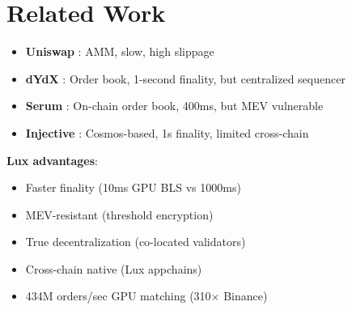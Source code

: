 \section{Related Work}


\begin{itemize}
    \item \textbf{Uniswap} \cite{adams2020}: AMM, slow, high slippage
    \item \textbf{dYdX} \cite{dydx2021}: Order book, 1-second finality, but centralized sequencer
    \item \textbf{Serum} \cite{serum2020}: On-chain order book, 400ms, but MEV vulnerable
    \item \textbf{Injective} \cite{injective2021}: Cosmos-based, 1s finality, limited cross-chain
\end{itemize}

\textbf{Lux advantages}:
\begin{itemize}
    \item Faster finality (10ms GPU BLS vs 1000ms)
    \item MEV-resistant (threshold encryption)
    \item True decentralization (co-located validators)
    \item Cross-chain native (Lux appchains)
    \item 434M orders/sec GPU matching (310$\times$ Binance)
\end{itemize}

